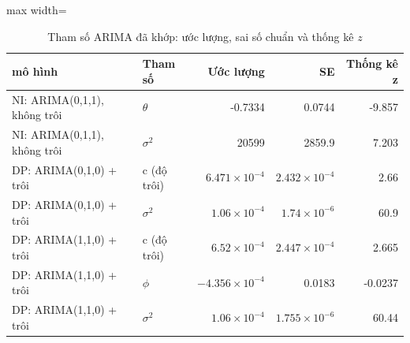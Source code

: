 \begin{table}[H]
\centering\small
\caption{Tham số ARIMA đã khớp: ước lượng, sai số chuẩn và thống kê $z$}\label{tab:tab_b12_05_arima_params}
\begin{adjustbox}{max width=\linewidth}
\begin{tabular}{llrrr}
\toprule
mô hình & Tham số & Ước lượng & SE & Thống kê z \\
\midrule
NI: ARIMA(0,1,1), không trôi & $\theta$ & -0.7334 & 0.0744 & -9.857 \\
NI: ARIMA(0,1,1), không trôi & $\sigma^{2}$ & 20599 & 2859.9 & 7.203 \\
DP: ARIMA(0,1,0) + trôi & c (độ trôi) & $6.471\times10^{-4}$ & $2.432\times10^{-4}$ & 2.66 \\
DP: ARIMA(0,1,0) + trôi & $\sigma^{2}$ & $1.06\times10^{-4}$ & $1.74\times10^{-6}$ & 60.9 \\
DP: ARIMA(1,1,0) + trôi & c (độ trôi) & $6.52\times10^{-4}$ & $2.447\times10^{-4}$ & 2.665 \\
DP: ARIMA(1,1,0) + trôi & $\phi$ & $-4.356\times10^{-4}$ & 0.0183 & -0.0237 \\
DP: ARIMA(1,1,0) + trôi & $\sigma^{2}$ & $1.06\times10^{-4}$ & $1.755\times10^{-6}$ & 60.44 \\
\bottomrule
\end{tabular}
\end{adjustbox}
\end{table}
